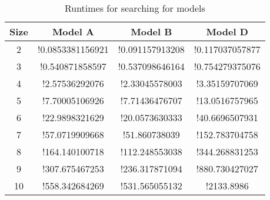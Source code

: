 \begin{table}[t]
  \centering
  \begin{tabular}[t]{|c|c|c|c|}\hline
    \textbf{Size} &  \textbf{Model A}   & \textbf{Model B} &  \textbf{Model D} \\\hline
   
    2 & !0.0853381156921 & !0.091157913208 & !0.117037057877 \\\hline
    3 & !0.540871858597 & !0.537098646164  & !0.754279375076 \\\hline
    4 & !2.57536292076 & !2.33045578003 & !3.35159707069 \\\hline
    5 & !7.70005106926 & !7.71436476707 & !13.0516757965 \\\hline
    6 & !22.9898321629 & !20.0573630333 & !40.6696507931 \\\hline
    7 & !57.0719909668 & !51.860738039 & !152.783704758 \\\hline
    8 & !164.140100718 &  !112.248553038 &  !344.268831253 \\\hline
    9 & !307.675467253 & !236.317871094 & !880.730427027\\\hline
    10 & !558.342684269 &  !531.565055132 &  !2133.8986\\\hline
  \end{tabular}
  \caption{Runtimes for searching for models}
  \label{tab:qf-grabh}
\end{table}


